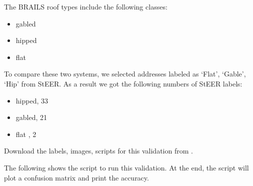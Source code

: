 \documentclass[letterpaper,10pt,english]{sphinxmanual}
\begin{document}
\sphinxAtStartPar
The BRAILS roof types include the following classes:
\begin{itemize}
\item {} 
\sphinxAtStartPar
gabled

\item {} 
\sphinxAtStartPar
hipped

\item {} 
\sphinxAtStartPar
flat

\end{itemize}

\sphinxAtStartPar
To compare these two systems, we selected addresses labeled as ‘Flat’, ‘Gable’, ‘Hip’ from StEER.
As a result we got the following numbers of StEER labels:
\begin{itemize}
\item {} 
\sphinxAtStartPar
hipped,    33

\item {} 
\sphinxAtStartPar
gabled,    21

\item {} 
\sphinxAtStartPar
flat  ,     2

\end{itemize}

\sphinxAtStartPar
Download the labels, images, scripts for this validation from .

\sphinxAtStartPar
The following shows the script to run this validation.
At the end, the script will plot a confusion matrix and print the accuracy.
\end{document}
